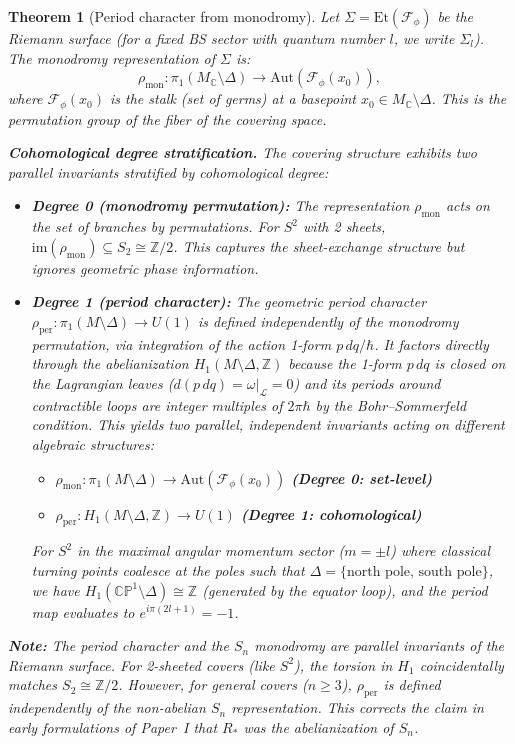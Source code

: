 \documentclass[11pt]{article}
\newtheorem{theorem}{Theorem}[section]
\begin{document}
\begin{theorem}[Period character from monodromy]
\label{thm:period-monodromy}
Let $\Sigma = \mathrm{Et}(\mathcal{F}_\phi)$ be the Riemann surface (for a fixed BS sector with quantum number $l$, we write $\Sigma_l$).
The monodromy representation of $\Sigma$ is:
\[
  \rho_{\mathrm{mon}}: \pi_1(M_\mathbb{C} \setminus \Delta)
  \longrightarrow \mathrm{Aut}(\mathcal{F}_\phi(x_0)),
\]
where $\mathcal{F}_\phi(x_0)$ is the stalk (set of germs) at a basepoint $x_0 \in M_\mathbb{C} \setminus \Delta$. This is the permutation group of the fiber of the covering space.

\textbf{Cohomological degree stratification.} The covering structure exhibits two parallel invariants stratified by cohomological degree:
\begin{itemize}
\item \textbf{Degree 0 (monodromy permutation):} The representation $\rho_{\mathrm{mon}}$
      acts on the \emph{set} of branches by permutations. For $S^2$ with
      2 sheets, $\mathrm{im}(\rho_{\mathrm{mon}}) \subseteq S_2 \cong \mathbb{Z}/2$.
      This captures the sheet-exchange structure but ignores geometric phase information.
\item \textbf{Degree 1 (period character):} The geometric period character
      $\rho_{\mathrm{per}}: \pi_1(M \setminus \Delta) \to U(1)$ is defined \emph{independently} of the monodromy permutation, via integration of the action 1-form $p\,dq/\hbar$.
      It factors directly through the abelianization $H_1(M \setminus \Delta, \mathbb{Z})$ because the 1-form $p\,dq$ is closed on the Lagrangian leaves ($d(p\,dq) = \omega|_{\mathcal{L}} = 0$) and its periods around contractible loops are integer multiples of $2\pi\hbar$ by the Bohr--Sommerfeld condition.
      This yields two parallel, independent invariants acting on different algebraic structures:
      \begin{itemize}
          \item[] $\rho_{\mathrm{mon}}: \pi_1(M \setminus \Delta) \longrightarrow \mathrm{Aut}(\mathcal{F}_\phi(x_0))$ \quad \textbf{(Degree 0: set-level)}
          \item[] $\rho_{\mathrm{per}}: H_1(M \setminus \Delta, \mathbb{Z}) \longrightarrow U(1)$ \quad \textbf{(Degree 1: cohomological)}
      \end{itemize}
      For $S^2$ in the maximal angular momentum sector ($m = \pm l$) where classical turning points coalesce at the poles such that $\Delta = \{\text{north pole, south pole}\}$, we have $H_1(\mathbb{CP}^1 \setminus \Delta) \cong \mathbb{Z}$ (generated by the equator loop), and the period map evaluates to $e^{i\pi(2l+1)} = -1$.
\end{itemize}

\textbf{Note:} The period character and the $S_n$ monodromy are parallel invariants of the Riemann surface. For 2-sheeted covers (like $S^2$), the torsion in $H_1$ coincidentally matches $S_2 \cong \mathbb{Z}/2$. However, for general covers ($n \geq 3$), $\rho_{\mathrm{per}}$ is defined independently of the non-abelian $S_n$ representation. This corrects the claim in early formulations of Paper~I that $R_*$ was the abelianization of $S_n$.
\end{theorem}
\end{document}
